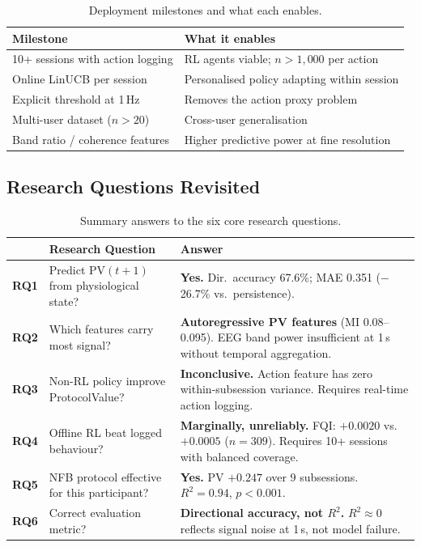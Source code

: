 \documentclass[11pt,a4paper]{article}
\begin{document}
\begin{table}[H]
\centering\small
\caption{Deployment milestones and what each enables.}
\begin{tabular}{p{5cm}p{7.5cm}}
\toprule
\textbf{Milestone} & \textbf{What it enables} \\
\midrule
10+ sessions with action logging & RL agents viable; $n>1{,}000$ per action \\
Online LinUCB per session        & Personalised policy adapting within session \\
Explicit threshold at 1\,Hz      & Removes the action proxy problem \\
Multi-user dataset ($n>20$)      & Cross-user generalisation \\
Band ratio / coherence features  & Higher predictive power at fine resolution \\
\bottomrule
\end{tabular}
\end{table}

\subsection{Research Questions Revisited}

\begin{table}[H]
\centering\small
\caption{Summary answers to the six core research questions.}
\setlength{\tabcolsep}{4pt}
\begin{tabular}{>{\bfseries}lp{3.6cm}p{8cm}}
\toprule
& \textbf{Research Question} & \textbf{Answer} \\
\midrule
RQ1 & Predict PV$(t{+}1)$ from physiological state? &
  \textbf{Yes.} Dir.\ accuracy 67.6\%; MAE 0.351 ($-$26.7\% vs.\ persistence). \\[3pt]
RQ2 & Which features carry most signal? &
  \textbf{Autoregressive PV features} (MI 0.08--0.095). EEG band power insufficient at 1\,s without temporal aggregation. \\[3pt]
RQ3 & Non-RL policy improve ProtocolValue? &
  \textbf{Inconclusive.} Action feature has zero within-subsession variance. Requires real-time action logging. \\[3pt]
RQ4 & Offline RL beat logged behaviour? &
  \textbf{Marginally, unreliably.} FQI: $+0.0020$ vs.\ $+0.0005$ ($n=309$). Requires 10+ sessions with balanced coverage. \\[3pt]
RQ5 & NFB protocol effective for this participant? &
  \textbf{Yes.} PV $+0.247$ over 9 subsessions. $R^2=0.94$, $p<0.001$. \\[3pt]
RQ6 & Correct evaluation metric? &
  \textbf{Directional accuracy, not $R^2$.} $R^2\approx 0$ reflects signal noise at 1\,s, not model failure. \\
\bottomrule
\end{tabular}
\end{table}
\end{document}
